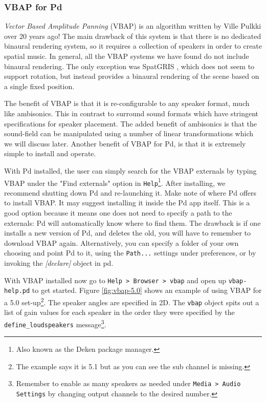 \subsubsection{VBAP for Pd} 

\textit{Vector Based Amplitude Panning} (VBAP) is an algorithm written by Ville Pulkki \cite{pulkki1997virtual} over 20 years ago! The main drawback of this system is that there is no dedicated binaural rendering system, so it requires a collection of speakers in order to create spatial music. In general, all the VBAP systems we have found do not include binaural rendering. The only exception was SpatGRIS \cite{ledoux2018immersive}, which does not seem to support rotation, but instead provides a binaural rendering of the scene based on a single fixed position. 

The benefit of VBAP is that it is re-configurable to any speaker format, much like ambisonics. This in contrast to surround sound formats which have stringent specifications for speaker placement. The added benefit of ambisonics is that the sound-field can be manipulated using a number of linear transformations which we will discuss later. Another benefit of VBAP for Pd, is that it is extremely simple to install and operate. 

With Pd installed, the user can simply search for the VBAP externals by typing VBAP under the "Find externals" option in \texttt{Help}\footnote{Also known as the Deken package manager.}. After installing, we recommend shutting down Pd and re-launching it. Make note of where Pd offers to install VBAP. It may suggest installing it inside the Pd app itself. This is a good option because it means one does not need to specify a path to the externals: Pd will automatically know where to find them. The drawback is if one installs a new version of Pd, and deletes the old, you will have to remember to download VBAP again. Alternatively, you can specify a folder of your own choosing and point Pd to it, using the \texttt{Path...} settings under preferences, or by invoking the \textit{[declare]} object in pd.

With VBAP installed now go to \texttt{Help > Browser > vbap} and open up \texttt{vbap-help.pd} to get started. Figure \ref{fig:vbap-5.0} shows an example of using VBAP for a 5.0 set-up\footnote{The example says it is 5.1 but as you can see the sub channel is missing.}. The speaker angles are specified in 2D. The \texttt{vbap} object spits out a list of gain values for each speaker in the order they were specified by the \texttt{define\_loudspeakers} message\footnote{Remember to enable as many speakers as needed under \texttt{Media > Audio Settings} by changing output channels to the desired number.}.

